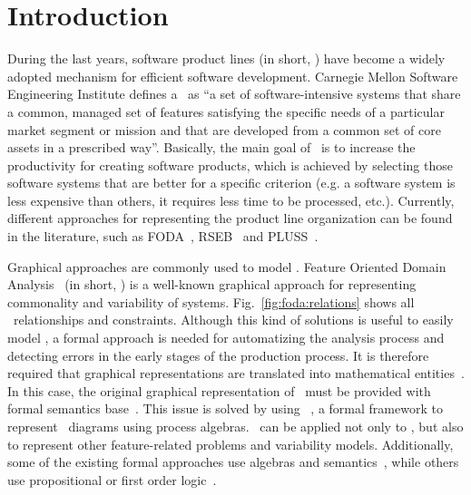 \section{Introduction}
\label{ref:introduction}


During the last years, software product lines (in short, \SPLs) have become a widely adopted mechanism for efficient software development. Carnegie Mellon Software Engineering Institute defines a \SPL\ as ``a set of software-intensive systems that share a common, managed set of features satisfying the specific needs of a particular market segment or mission and that are developed from a common set of core assets in a prescribed way''. Basically, the main goal of \SPLs\ is to increase the productivity for creating software products, which is achieved by selecting those software systems that are better for a specific criterion (e.g. a software system is less expensive than others, it requires less time to be processed, etc.). Currently, different approaches for representing the product line organization can be found in the literature, such as FODA~\cite{kchnp90},
RSEB~\cite{mj98} and PLUSS~\cite{k05,ebb06}.

Graphical approaches are commonly used to model \SPLs. Feature Oriented Domain Analysis~\cite{kchnp90} (in short, \FODA) is a well-known graphical approach for representing commonality and variability of systems. Fig.~\ref{fig:foda:relations} shows all \FODA\ relationships and constraints.
Although this kind of solutions is useful to easily model \SPLs, a formal approach is needed for automatizing the analysis process and detecting errors in the early stages of the production process. It is therefore required that graphical representations are translated into mathematical entities~\cite{nak10}. In this case, the original graphical representation of \FODA\ must be provided with formal semantics base~\cite{bhst04}. 
%
This  issue is solved by using \fodaPA~\cite{acl13}, a formal framework to represent \FODA\ diagrams using process algebras. \fodaPA\ can be applied not only to \FODA, but also to represent other feature-related problems and variability models. Additionally, some of the existing formal approaches use algebras and semantics~\cite{szw05,kkm06,prb11,acl13}, while others use propositional or first order logic~\cite{man02,ka07,abgf10,atfg10,nnz14}.

